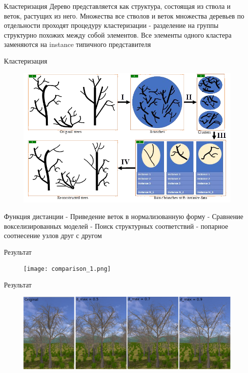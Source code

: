 \documentclass[14pt]{beamer}
\begin{document}
\begin{frame}{Кластеризация}
Дерево представляется как структура, состоящая из ствола и веток, растущих из него. \linebreak	
Множества все стволов и веток множества деревьев по отдельности проходят процедуру кластеризации - разделение на группы структурно похожих между собой элементов.\linebreak	
Все элементы одного кластера заменяются на instance типичного представителя\linebreak	
\end{frame}
\begin{frame}{Кластеризация}
\begin{figure}[hbtp]
\includegraphics[scale=0.56]{Clustering.png}
\end{figure}
\end{frame}
\begin{frame}{Функция дистанции}
 - Приведение веток в нормализованную форму\linebreak	
 - Сравнение вокселизированных моделей \linebreak	
 - Поиск структурных соответствий - попарное соотнесение узлов друг с другом

\end{frame}
\begin{frame}{Результат}
\begin{figure}[hbtp]
\texttt{[image: comparison\_1.png]}
\end{figure}
\end{frame}
\begin{frame}{Результат}
\begin{figure}[hbtp]
\includegraphics[scale=0.15]{comparison_2.png}
\end{figure}
\end{frame}
\end{document}
